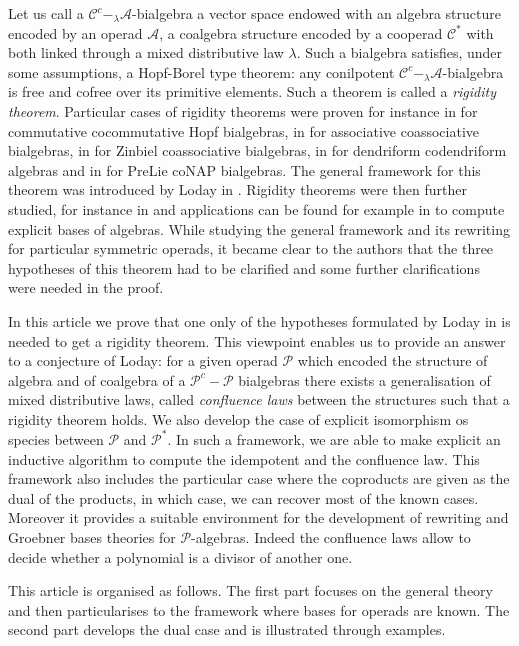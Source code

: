 \documentclass[11pt,leqno]{amsart}
\theoremstyle{definition}
\theoremstyle{plain}
\newcommand{\A}{ \mathcal{A} }
\newcommand{\C}{ \mathcal{C} }
\begin{document}
Let us call a $\C^c-_{\lambda}\A$-bialgebra a vector space endowed with an algebra structure encoded by an operad $\A$, a coalgebra structure encoded by a cooperad $\C^*$ with both linked through a mixed distributive law $\lambda$. Such a bialgebra satisfies, under some assumptions, a Hopf-Borel type theorem: any conilpotent $\C^c-_{\lambda}\A$-bialgebra is free and cofree over its primitive elements. Such a theorem is called a \emph{rigidity theorem}. Particular cases of rigidity theorems were proven for instance in \cite{Borel} for commutative cocommutative Hopf bialgebras, in \cite{nui} for associative coassociative bialgebras, in \cite{AsZinb} for Zinbiel coassociative bialgebras, in \cite{Foissy} for dendriform codendriform algebras and in \cite{NAPPL} for PreLie coNAP bialgebras. The general framework for this theorem was introduced by Loday in \cite{GBO}. Rigidity theorems were then further studied, for instance in \cite{Muriel} and applications can be found for example in \cite{EPLM} to compute explicit bases of algebras. While studying the general framework and its rewriting for particular symmetric operads, it became clear to the authors that the three hypotheses of this theorem had to be clarified and some further clarifications were needed in the proof.


In this article we prove that one only of the hypotheses formulated by Loday in \cite{GBO} is needed to get a rigidity theorem. This viewpoint enables us to provide an answer to a conjecture of Loday: for a given operad $\mathcal{P}$ which encoded the structure of algebra and of coalgebra of a  $\mathcal{P}^c-\mathcal{P}$ bialgebras there exists a generalisation of mixed distributive laws, called \emph{confluence laws} between the structures such that a rigidity theorem holds. We also develop the case of explicit isomorphism os species between $\mathcal{P}$ and $\mathcal{P}^*$. In such a framework, we are able to make explicit an inductive algorithm to compute the idempotent and the confluence law. This framework also includes the particular case where the coproducts are given as the dual of the products, in which case, we can recover most of the known cases.  Moreover it provides a suitable environment for the development of rewriting and Groebner bases theories for $\mathcal{P}$-algebras. Indeed the confluence laws allow to decide whether a polynomial is a divisor of another one. 


This article is organised as follows. The first part focuses on the general theory and then particularises to the framework where bases for operads are known. The second part develops the dual case and is illustrated through examples. 
\end{document}
